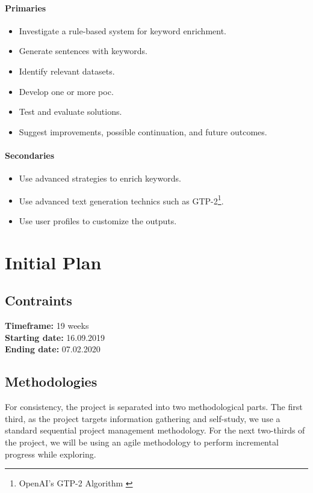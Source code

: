 \paragraph{Primaries}
\begin{itemize}[noitemsep]
    \item Investigate a rule-based system for keyword enrichment.
    \item Generate sentences with keywords.
    \item Identify relevant datasets.
    \item Develop one or more \gls{poc}.
    \item Test and evaluate solutions.
    \item Suggest improvements, possible continuation, and future outcomes.
\end{itemize}
\paragraph{Secondaries}
\begin{itemize}[noitemsep]
    \item Use advanced strategies to enrich keywords.
    \item Use advanced text generation technics such as GTP-2\footnote{OpenAI's GTP-2 Algorithm \autocite{papers:gpt2}}.
    \item Use user profiles to customize the outputs.
\end{itemize}


\section{Initial Plan}
\label{plan:plan}
\subsection{Contraints}
\textbf{Timeframe:} 19 weeks\\
\textbf{Starting date:} 16.09.2019\\
\textbf{Ending date:} 07.02.2020

\subsection{Methodologies}
For consistency, the project is separated into two methodological parts. The first third, as the project targets information gathering and self-study, we use a standard sequential project management methodology. For the next two-thirds of the project, we will be using an agile methodology to perform incremental progress while exploring.

